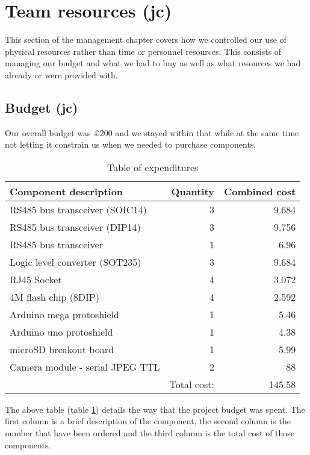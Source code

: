 \section{Team resources (jc)}
\label{sec:team_resources}

This section of the management chapter covers how we controlled our use of physical resources rather than time or personnel resources. This consists of managing our budget and what we had to buy as well as what resources we had already or were provided with.

\subsection{Budget (jc)}

Our overall budget was \pounds 200 and we stayed within that while at the same time not letting it constrain us when we needed to purchase components.

\begin{table}[H]
\begin{tabular}{| l | r || r |}
\hline
\textbf{Component description} & \textbf{Quantity} & \textbf{Combined cost} \\ \hline \hline
RS485 bus transceiver (SOIC14) & 3 & 9.684 \\ \hline
RS485 bus transceiver (DIP14) & 3 & 9.756 \\ \hline
RS485 bus transceiver & 1 & 6.96 \\ \hline
Logic level converter (SOT235) & 3 & 9.684 \\ \hline
RJ45 Socket & 4 & 3.072 \\ \hline
4M flash chip (8DIP) & 4 & 2.592 \\ \hline
Arduino mega protoshield & 1 & 5.46 \\ \hline
Arduino uno protoshield & 1 & 4.38 \\ \hline
microSD breakout board & 1 & 5.99 \\ \hline
Camera module - serial JPEG TTL & 2 & 88 \\ \hline \hline
 & Total cost: & 145.58 \\ \hline
\end{tabular}
\caption{Table of expenditures}
\label{expenditure}
\end{table}

The above table (table \ref{expenditure}) details the way that the project budget was spent. The first column is a brief description of the component, the second column is the number that have been ordered and the third column is the total cost of those components.

